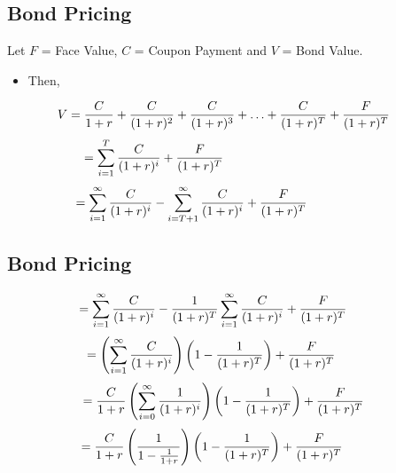 \documentclass[letterpaper,10pt,english]{sphinxmanual}
\begin{document}
\subsection{Bond Pricing}
\label{bondPrices:bond-pricing}
Let $F$ = Face Value, $C$ = Coupon Payment and $V$ =
Bond Value.
\begin{itemize}
\item {} 
Then,

\end{itemize}
\begin{gather}
\begin{split}V & = \frac{C}{1+r} + \frac{C}{(1+r)^2} + \frac{C}{(1+r)^3} +
\ldots + \frac{C}{(1+r)^T} + \frac{F}{(1+r)^T}\end{split}\notag
\end{gather}\begin{gather}
\begin{split}& = \sum_{i=1}^T \frac{C}{(1+r)^i} + \frac{F}{(1+r)^T} \qquad
\qquad \qquad \qquad \qquad \quad \enspace \,\end{split}\notag
\end{gather}\begin{gather}
\begin{split}& = \sum_{i=1}^{\infty} \frac{C}{(1+r)^i} - \sum_{i=T+1}^{\infty}
\frac{C}{(1+r)^i} + \frac{F}{(1+r)^T} \qquad \qquad \quad \enspace\end{split}\notag
\end{gather}

\subsection{Bond Pricing}
\label{bondPrices:id7}\begin{gather}
\begin{split}& = \sum_{i=1}^{\infty} \frac{C}{(1+r)^i} - \frac{1}{(1+r)^T}
\sum_{i=1}^{\infty} \frac{C}{(1+r)^i} + \frac{F}{(1+r)^T} \qquad\end{split}\notag
\end{gather}\begin{gather}
\begin{split}\hspace{0.25in} & = \left(\sum_{i=1}^{\infty}
\frac{C}{(1+r)^i}\right) \left(1 - \frac{1}{(1+r)^T}\right) +
\frac{F}{(1+r)^T} \qquad \qquad \,\end{split}\notag
\end{gather}\begin{gather}
\begin{split}& = \frac{C}{1+r} \left(\sum_{i=0}^{\infty}
\frac{1}{(1+r)^i}\right) \left(1 - \frac{1}{(1+r)^T}\right) +
\frac{F}{(1+r)^T} \, \,\end{split}\notag
\end{gather}\begin{gather}
\begin{split}& = \frac{C}{1+r} \left(\frac{1}{1-\frac{1}{1+r}}\right) \left(1 -
\frac{1}{(1+r)^T}\right) + \frac{F}{(1+r)^T} \qquad \,\end{split}\notag
\end{gather}
\end{document}
